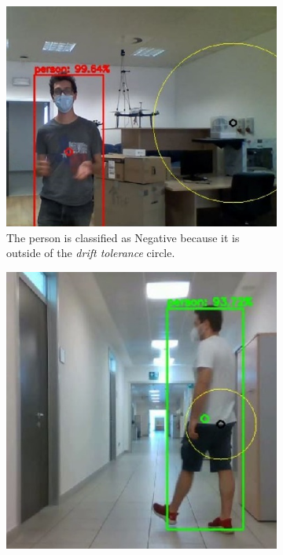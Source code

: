 \begin{figure}[!h]
	\centering
	\begin{subfigure}[!h]{0.49\textwidth}
		\includegraphics[width=\linewidth]{images/solution/driftOptimizationFail}
		\captionsetup{margin=0.5cm}
		\caption{The person is classified as Negative because it is outside of the \textit{drift tolerance} circle.}
		\label{fig:driftOptimizationFail}
	\end{subfigure}
	\begin{subfigure}[!h]{0.39\textwidth}
		\includegraphics[width=\linewidth]{images/solution/driftOptimizationOk}

\end{subfigure}
\end{figure}
